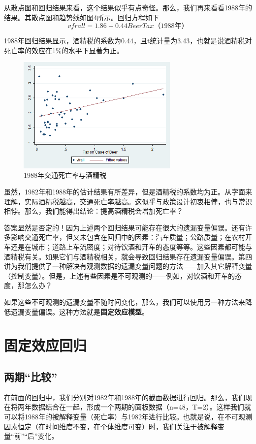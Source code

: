 \documentclass[cn,12pt,math=newtx,citestyle=gb7714-2015,bibstyle=gb7714-2015]{elegantbook}
\begin{document}
从散点图和回归结果来看，这个结果似乎有点奇怪。那么，我们再来看看1988年的结果。其散点图和趋势线如图4所示。回归方程如下
\begin{equation}
	vfrall=1.86+0.44BeerTax（1988年）
\end{equation}

1988年回归结果显示，酒精税的系数为0.44，且t统计量为3.43，也就是说酒精税对死亡率的效应在1\%的水平下显著为正。
\begin{figure}[htbp]
	\centering
	\includegraphics[width=0.7\textwidth]{1988.png}
	\caption{1988年交通死亡率与酒精税}\label{fig:digit}
\end{figure}

虽然，1982年和1988年的估计结果有所差异，但是酒精税的系数均为正。从字面来理解，实际酒精税越高，交通死亡率越高。这似乎与政策设计初衷相悖，也与常识相悖。那么，我们能得出结论：提高酒精税会增加死亡率？

答案显然是否定的！因为上述两个回归结果可能存在很大的遗漏变量偏误。还有许多影响交通死亡率，但又未包含在回归中的因素：汽车质量；公路质量；在农村开车还是在城市；道路上车流密度；对待饮酒和开车的态度等等。这些因素都可能与酒精税有关。如果它们与酒精税相关，就会导致回归结果存在遗漏变量偏误。第四讲为我们提供了一种解决有观测数据的遗漏变量问题的方法——加入其它解释变量（控制变量）。但是，上述有些因素是不可观测的——例如，对饮酒和开车的态度，那怎么办？

如果这些不可观测的遗漏变量不随时间变化，那么，我们可以使用另一种方法来降低遗漏变量偏误。这种方法就是\textbf{固定效应模型}。

\section{固定效应回归}
\subsection{两期“比较”}
在前面的回归中，我们分别对1982年和1988年的截面数据进行回归。那么，我们现在将两年数据结合在一起，形成一个两期的面板数据（n=48，T=2）。这样我们就可以将1988年的被解释变量（死亡率）与1982年进行比较。也就是说，在不可观测因素恒定（在时间维度不变，在个体维度可变）时，我们关注于被解释变量“前”“后”变化。
\end{document}

